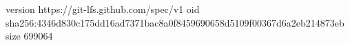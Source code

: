 version https://git-lfs.github.com/spec/v1
oid sha256:4346d830c175dd16ad7371bac8a0f8459690658d5109f00367d6a2eb214873eb
size 699064
